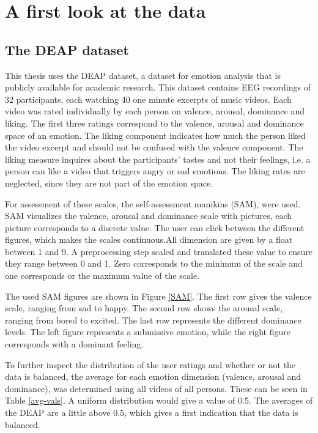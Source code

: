 \chapter{A first look at the data}
{\samenvatting }

\section{The DEAP dataset}
This thesis uses the DEAP dataset\cite{DEAP}, a dataset for emotion analysis that is publicly available for academic research. This dataset contains EEG recordings of 32 participants, each watching 40 one minute excerpts of music videos. Each video was rated individually by each person on valence, arousal, dominance and liking. The first three ratings correspond to the valence, arousal and dominance space of an emotion. The liking component indicates how much the person liked the video excerpt and should not be confused with the valence component. The liking measure inquires about the participants' tastes and not their feelings, i.e. a person can like a video that triggers angry or sad emotions. The liking rates are neglected, since they are not part of the emotion space.

\npar

For assessment of these scales, the self-assessment manikins (SAM), were used\cite{DEAP}. SAM visualizes the valence, arousal and dominance scale with pictures, each picture corresponds to a discrete value. The user can click between the different figures, which makes the scales continuous.All dimension are given by a float between 1 and 9. A preprocessing step scaled and translated these value to ensure they range between 0 and 1. Zero corresponds to the minimum of the scale and one corresponds or the maximum value of the scale.

The used SAM figures are shown in Figure \ref{SAM}. The first row gives the valence scale, ranging from sad to happy. The second row shows the arousal scale, ranging from bored to excited. The last row represents the different dominance levels. The left figure represents a submissive emotion, while the right figure corresponds with a dominant feeling.


To further inspect the distribution of the user ratings and whether or not the data is balanced, the average for each emotion dimension (valence, arousal and dominance), was determined using all videos of all persons. These can be seen in Table \ref{avg-vals}. A uniform distribution would give a value of 0.5. The averages of the DEAP are a little above 0.5, which gives a first indication that the data is balanced.

